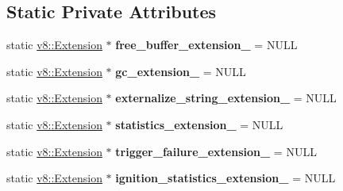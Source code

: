 \subsection*{Static Private Attributes}
\begin{DoxyCompactItemize}
\item 
static \hyperlink{classv8_1_1_extension}{v8\+::\+Extension} $\ast$ {\bfseries free\+\_\+buffer\+\_\+extension\+\_\+} = N\+U\+LL\hypertarget{classv8_1_1internal_1_1_bootstrapper_a4c14085c3bdc9597bb8c784dd9c042c3}{}\label{classv8_1_1internal_1_1_bootstrapper_a4c14085c3bdc9597bb8c784dd9c042c3}

\item 
static \hyperlink{classv8_1_1_extension}{v8\+::\+Extension} $\ast$ {\bfseries gc\+\_\+extension\+\_\+} = N\+U\+LL\hypertarget{classv8_1_1internal_1_1_bootstrapper_a920973833357d817dcda811b81d4e3d8}{}\label{classv8_1_1internal_1_1_bootstrapper_a920973833357d817dcda811b81d4e3d8}

\item 
static \hyperlink{classv8_1_1_extension}{v8\+::\+Extension} $\ast$ {\bfseries externalize\+\_\+string\+\_\+extension\+\_\+} = N\+U\+LL\hypertarget{classv8_1_1internal_1_1_bootstrapper_a6396a4879a5f8448c5a0927e5ffe2659}{}\label{classv8_1_1internal_1_1_bootstrapper_a6396a4879a5f8448c5a0927e5ffe2659}

\item 
static \hyperlink{classv8_1_1_extension}{v8\+::\+Extension} $\ast$ {\bfseries statistics\+\_\+extension\+\_\+} = N\+U\+LL\hypertarget{classv8_1_1internal_1_1_bootstrapper_aa45da1ec5941ba50452e0f63eb04877b}{}\label{classv8_1_1internal_1_1_bootstrapper_aa45da1ec5941ba50452e0f63eb04877b}

\item 
static \hyperlink{classv8_1_1_extension}{v8\+::\+Extension} $\ast$ {\bfseries trigger\+\_\+failure\+\_\+extension\+\_\+} = N\+U\+LL\hypertarget{classv8_1_1internal_1_1_bootstrapper_a13fd9f2becd2bca62c1c9b11ad35fa32}{}\label{classv8_1_1internal_1_1_bootstrapper_a13fd9f2becd2bca62c1c9b11ad35fa32}

\item 
static \hyperlink{classv8_1_1_extension}{v8\+::\+Extension} $\ast$ {\bfseries ignition\+\_\+statistics\+\_\+extension\+\_\+} = N\+U\+LL\hypertarget{classv8_1_1internal_1_1_bootstrapper_a116dcf3b7715ad26e4deada8cf044ba5}{}\label{classv8_1_1internal_1_1_bootstrapper_a116dcf3b7715ad26e4deada8cf044ba5}

\end{DoxyCompactItemize}
